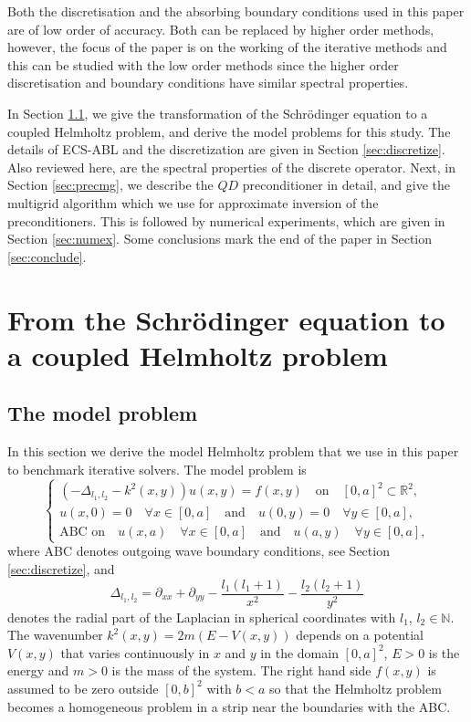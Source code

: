 \documentclass[mathpazo]{cicp}
\theoremstyle{definition}
\numberwithin{equation}{section}
\providecommand{\wv}{}
\providecommand{\hbz}{}
\begin{document}
\wv{Both the discretisation and the absorbing boundary conditions used
  in this paper are of low order of accuracy. Both can be replaced by
  higher order methods, however, the focus of the paper is on the
  working of the iterative methods and this can be studied with the
  low order methods since the higher order discretisation and
  boundary conditions have similar spectral properties.}

In Section \ref{sec:derive}, we give the transformation of the
Schr\"odinger equation to a coupled Helmholtz problem, and derive the
model problems for this study. The details of ECS-ABL and \hbz{the discretization} are given in Section \ref{sec:discretize}. Also reviewed
here, are the spectral properties of the discrete operator. Next, in
Section \ref{sec:precmg}, we describe the $QD$ preconditioner in detail,
and give the multigrid algorithm which we use for approximate
inversion of the preconditioners. This is followed by numerical
experiments, which are given in Section \ref{sec:numex}. Some
conclusions mark the end of the paper in Section \ref{sec:conclude}.
 
\section{From the Schr\"odinger equation to a coupled Helmholtz problem}
\subsection{The model problem}
\label{sec:derive}
In this section we derive the model Helmholtz problem that we use in
this paper to benchmark iterative solvers.  The model problem is \wv{
\begin{equation}\label{eq:modelproblem}
\left\{\begin{split}
 \left(-\Delta_{l_1,l_2} - k^2(x,y) \right) u(x,y) = f(x,y) \quad \text{on}\quad [0,a]^2 \subset \mathbb{R}^2,\\
 u(x,0) = 0 \quad  \forall x \in [0,a]  \quad \text{and}\quad  u(0,y) = 0 \quad \forall y \in [0,a],\\
 \text{ABC on} \quad u(x,a)\quad   \forall x \in [0,a]  \quad \text{and} \quad  u(a,y)\quad   \forall y \in [0,a],
 \end{split}
\right.
\end{equation}
where  ABC denotes outgoing wave boundary conditions, see Section \ref{sec:discretize}, and 
}
\begin{equation}\label{eq:definition_delta}
 \Delta_{l_1,l_2} = \partial_{xx} + \partial_{yy} -\frac{l_1(l_1+1)}{ x^2} - \frac{l_2(l_2+1)}{y^2}
\end{equation}
\wv{ 
denotes the radial part of the Laplacian in spherical coordinates with $l_1$, $l_2 \in \mathbb{N}$.
The wavenumber $k^2(x,y) = 2m(E-V(x,y))$ depends on a potential
$V(x,y)$ that} \hbz{varies continuously in} \wv{$x$ and $y$}
\hbz{in the domain }\wv{ $[0,a]^2$,  $E>0$ is the energy and $m>0$ is the mass of the system.  The right hand side $f(x,y)$ is assumed
to be zero outside $[0,b]^2$ with $b<a$ so that the Helmholtz problem becomes a
 homogeneous problem  in a strip near the boundaries with the ABC.}
\end{document}
